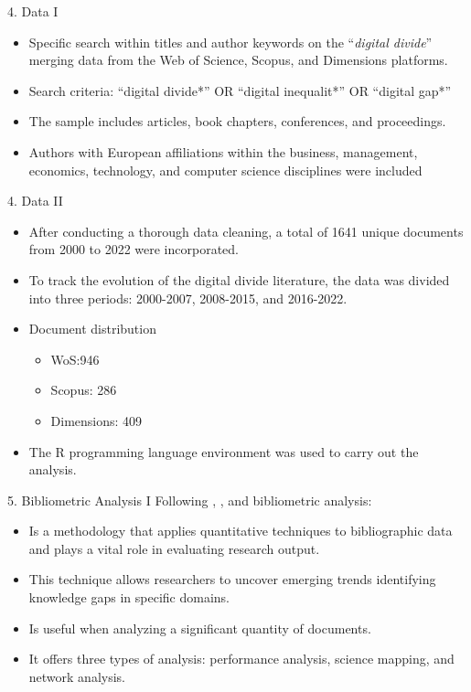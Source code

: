 \documentclass[
  ignorenonframetext,
]{beamer}
\providecommand{\tightlist}{%
  \setlength{\itemsep}{0pt}\setlength{\parskip}{0pt}}
\begin{document}
\begin{frame}{4. Data I}
\protect\hypertarget{data-i}{}
\begin{itemize}
\tightlist
\item
  Specific search within titles and author keywords on the
  ``\emph{digital divide}'' merging data from the Web of Science,
  Scopus, and Dimensions platforms.
\item
  Search criteria: ``digital divide*'' OR ``digital inequalit*'' OR
  ``digital gap*''
\item
  The sample includes articles, book chapters, conferences, and
  proceedings.
\item
  Authors with European affiliations within the business, management,
  economics, technology, and computer science disciplines were included
\end{itemize}
\end{frame}

\begin{frame}{4. Data II}
\protect\hypertarget{data-ii}{}
\begin{itemize}
\item
  After conducting a thorough data cleaning, a total of 1641 unique
  documents from 2000 to 2022 were incorporated.
\item
  To track the evolution of the digital divide literature, the data was
  divided into three periods: 2000-2007, 2008-2015, and 2016-2022.
\item
  Document distribution

  \begin{itemize}
  \tightlist
  \item
    WoS:946
  \item
    Scopus: 286
  \item
    Dimensions: 409
  \end{itemize}
\item
  The R programming language environment was used to carry out the
  analysis.
\end{itemize}
\end{frame}

\begin{frame}{5. Bibliometric Analysis I}
\protect\hypertarget{bibliometric-analysis-i}{}
Following \citet{donthu2021}, \citet{Aria2017}, \citet{ellegaard2015}
and \citet{Bornmann2015} bibliometric analysis:

\begin{itemize}
\tightlist
\item
  Is a methodology that applies quantitative techniques to bibliographic
  data and plays a vital role in evaluating research output.
\item
  This technique allows researchers to uncover emerging trends
  identifying knowledge gaps in specific domains.
\item
  Is useful when analyzing a significant quantity of documents.
\item
  It offers three types of analysis: performance analysis, science
  mapping, and network analysis.
\end{itemize}
\end{frame}
\end{document}

